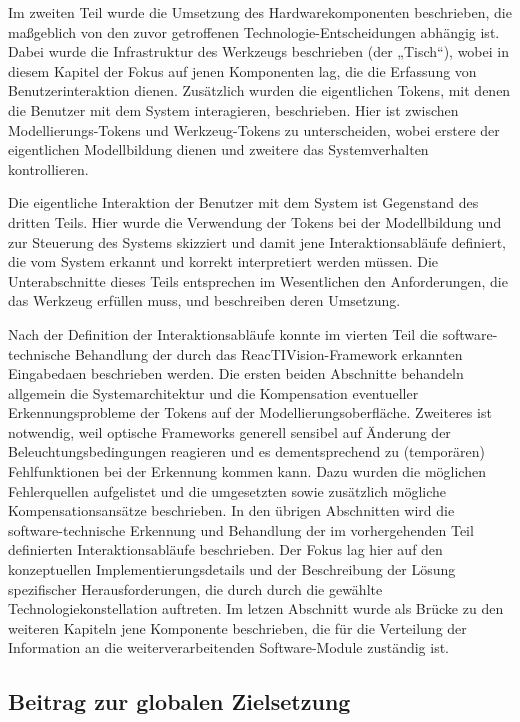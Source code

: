 Im zweiten Teil wurde die Umsetzung des Hardwarekomponenten beschrieben, die maßgeblich von den zuvor getroffenen Technologie-Entscheidungen abhängig ist. Dabei wurde die Infrastruktur des Werkzeugs beschrieben (der „Tisch“), wobei in diesem Kapitel der Fokus auf jenen Komponenten lag, die die Erfassung von Benutzerinteraktion dienen. Zusätzlich wurden die eigentlichen Tokens, mit denen die Benutzer mit dem System interagieren, beschrieben. Hier ist zwischen Modellierungs-Tokens und Werkzeug-Tokens zu unterscheiden, wobei erstere der eigentlichen Modellbildung dienen und zweitere das Systemverhalten kontrollieren.

Die eigentliche Interaktion der Benutzer mit dem System ist Gegenstand des dritten Teils. Hier wurde die Verwendung der Tokens bei der Modellbildung und zur Steuerung des Systems skizziert und damit jene Interaktionsabläufe definiert, die vom System erkannt und korrekt interpretiert werden müssen. Die Unterabschnitte dieses Teils entsprechen im Wesentlichen den Anforderungen, die das Werkzeug erfüllen muss, und beschreiben deren Umsetzung.

Nach der Definition der Interaktionsabläufe konnte im vierten Teil die software-technische Behandlung der durch das ReacTIVision-Framework erkannten Eingabedaen beschrieben werden. Die ersten beiden Abschnitte behandeln allgemein die Systemarchitektur und die Kompensation eventueller Erkennungsprobleme der Tokens auf der Modellierungsoberfläche. Zweiteres ist notwendig, weil optische Frameworks generell sensibel auf Änderung der Beleuchtungsbedingungen reagieren und es dementsprechend zu (temporären) Fehlfunktionen bei der Erkennung kommen kann. Dazu wurden die möglichen Fehlerquellen aufgelistet und die umgesetzten sowie zusätzlich mögliche Kompensationsansätze beschrieben. In den übrigen Abschnitten wird die software-technische Erkennung und Behandlung der im vorhergehenden Teil definierten Interaktionsabläufe beschrieben. Der Fokus lag hier auf den konzeptuellen Implementierungsdetails und der Beschreibung der Lösung spezifischer Herausforderungen, die durch durch die gewählte Technologiekonstellation auftreten. Im letzen Abschnitt wurde als Brücke zu den weiteren Kapiteln jene Komponente beschrieben, die für die Verteilung der Information an die weiterverarbeitenden Software-Module zuständig ist.

\subsection{Beitrag zur globalen Zielsetzung}

